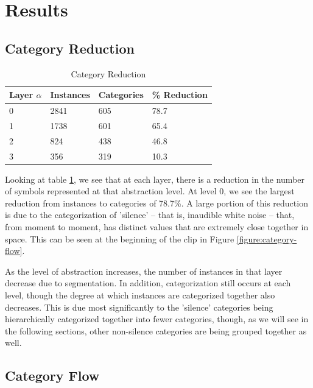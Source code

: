 \section{Results}
\label{section:results}

\subsection{Category Reduction}
\label{section:category-reduction}

\begin{table}
\centering
\begin{tabular}{@{}llll@{}}
  \toprule
  Layer $\alpha$ & Instances & Categories & \% Reduction \\
  \midrule
  0 & 2841 & 605 & 78.7 \\
  1 & 1738 & 601 & 65.4 \\
  2 & 824 & 438 & 46.8 \\
  3 & 356 & 319 & 10.3 \\
  \bottomrule
\end{tabular}
\caption{Category Reduction}
\label{table:category-reduction}
\end{table}

Looking at table \ref{table:category-reduction}, we see that at each layer, there is a reduction in the number of symbols represented at that abstraction level.  At level 0, we see the largest reduction from instances to categories of 78.7\%.  A large portion of this reduction is due to the categorization of 'silence' -- that is, inaudible white noise -- that, from moment to moment, has distinct values that are extremely close together in space.  This can be seen at the beginning of the clip in Figure \ref{figure:category-flow}.

As the level of abstraction increases, the number of instances in that layer decrease due to segmentation.  In addition, categorization still occurs at each level, though the degree at which instances are categorized together also decreases.  This is due most significantly to the 'silence' categories being hierarchically categorized together into fewer categories, though, as we will see in the following sections, other non-silence categories are being grouped together as well.

\subsection{Category Flow}
\label{section:category-flow}

